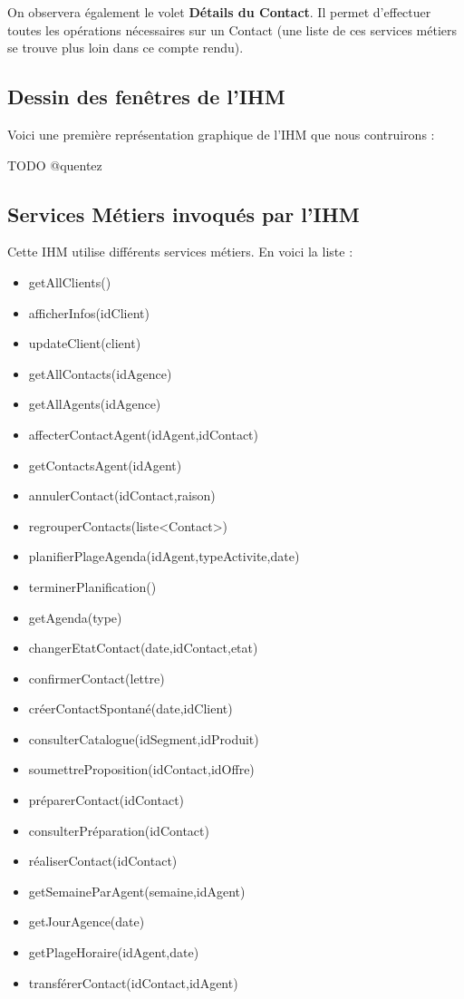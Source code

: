On observera également le volet \textbf{Détails du Contact}. Il permet d'effectuer toutes les
opérations nécessaires sur un Contact (une liste de ces services métiers se trouve plus loin
dans ce compte rendu).

\subsection{Dessin des fenêtres de l'IHM}

Voici une première représentation graphique de l'IHM que nous contruirons :

TODO @quentez

\subsection{Services Métiers invoqués par l'IHM}

Cette IHM utilise différents services métiers. En voici la liste :

\begin{itemize}
\item getAllClients()
\item afficherInfos(idClient)
\item updateClient(client)
\item getAllContacts(idAgence)
\item getAllAgents(idAgence)
\item affecterContactAgent(idAgent,idContact)
\item getContactsAgent(idAgent)
\item annulerContact(idContact,raison)
\item regrouperContacts(liste<Contact>)
\item planifierPlageAgenda(idAgent,typeActivite,date)
\item terminerPlanification()
\item getAgenda(type)
\item changerEtatContact(date,idContact,etat)
\item confirmerContact(lettre)
\item créerContactSpontané(date,idClient)
\item consulterCatalogue(idSegment,idProduit)
\item soumettreProposition(idContact,idOffre)
\item préparerContact(idContact)
\item consulterPréparation(idContact)
\item réaliserContact(idContact)
\item getSemaineParAgent(semaine,idAgent)
\item getJourAgence(date)
\item getPlageHoraire(idAgent,date)
\item transférerContact(idContact,idAgent)
\end{itemize}

